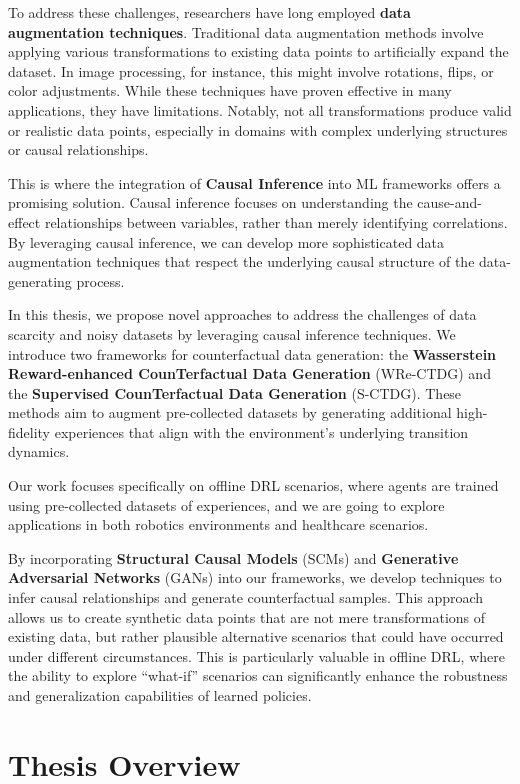 To address these challenges, researchers have long employed
\textbf{data augmentation techniques}. Traditional data augmentation
methods involve
applying various transformations to existing data points to artificially
expand the dataset. In image processing, for instance, this might involve
rotations, flips, or color adjustments. While these techniques have proven
effective in many applications, they have limitations.
Notably, not all transformations produce valid or realistic data points,
especially in domains with complex underlying structures or causal relationships.

This is where the integration of \textbf{Causal Inference} into
ML frameworks offers a
promising solution. Causal inference focuses on understanding the
cause-and-effect relationships between variables, rather
than merely identifying correlations. By leveraging causal inference,
we can develop more sophisticated data augmentation techniques that
respect the underlying causal structure of the data-generating process.

In this thesis, we propose novel approaches to address the
challenges of data scarcity and noisy datasets by leveraging
causal inference techniques. We introduce two frameworks for
counterfactual data generation:
the \textbf{Wasserstein Reward-enhanced CounTerfactual Data Generation}
(WRe-CTDG) and the \textbf{Supervised CounTerfactual Data Generation} (S-CTDG).
These methods aim to augment pre-collected datasets by generating additional
high-fidelity experiences that align with the environment's underlying
transition dynamics.

Our work focuses specifically on offline DRL scenarios, where agents
are trained using pre-collected datasets of experiences,
and we are going to explore applications in both robotics environments
and healthcare scenarios.

By incorporating \textbf{Structural Causal Models} (SCMs) and
\textbf{Generative Adversarial Networks} (GANs) into our frameworks,
we develop techniques to infer causal relationships and generate counterfactual
samples. This approach allows us to create synthetic data points
that are not mere transformations of existing data, but rather plausible
alternative scenarios that could have occurred under different circumstances.
This is particularly valuable in offline DRL, where the ability to explore
``what-if'' scenarios can significantly enhance the robustness
and generalization capabilities of learned policies.

\section{Thesis Overview}

